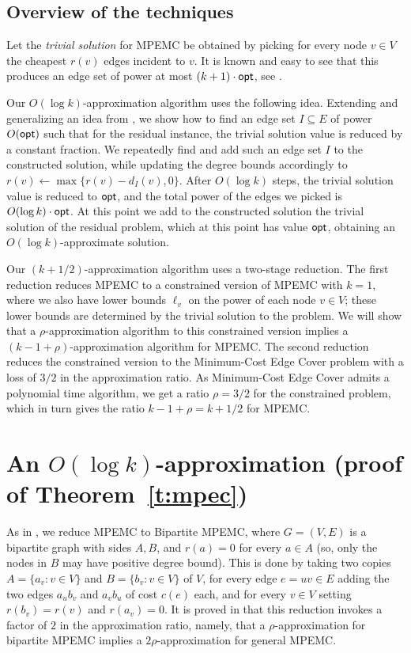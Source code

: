 \documentclass{llncs}
\begin{document}
\subsection{Overview of the techniques}

Let the {\em trivial solution} for {\sf MPEMC} be obtained by picking for every 
node $v \in V$ the cheapest $r(v)$ edges incident to $v$.
It is known and easy to see that this produces an edge set of power at most 
$(k+1) \cdot {\sf opt}$, see \cite{HKMN}. 

Our $O(\log k)$-approximation algorithm uses the following idea.
Extending and generalizing an idea from \cite{KMNT},
we show how to find an edge set $I \subseteq E$ of power $O({\sf opt})$
such that for the residual instance, 
the trivial solution value is reduced by a constant fraction.
We repeatedly find and add such an edge set $I$ to the constructed solution, 
while updating the degree bounds accordingly to $r(v) \gets \max\{r(v)-d_I(v),0\}$.
After $O(\log k)$ steps, the trivial solution value is reduced to ${\sf opt}$, 
and the total power of the edges we picked is $O(\log k) \cdot {\sf opt}$.
At this point we add to the constructed solution the trivial solution of the residual problem,
which at this point has value ${\sf opt}$, obtaining an $O(\log k)$-approximate solution.

Our $(k+1/2)$-approximation algorithm uses a two-stage reduction.
The first reduction reduces {\sf MPEMC} to a constrained version of {\sf MPEMC} 
with $k=1$, where we also have lower bounds $\ell_v$ on the power 
of each node $v \in V$; these lower bounds are determined by the trivial solution
to the problem. We will show that a $\rho$-approximation 
algorithm to this constrained version implies a $(k-1+\rho)$-approximation
algorithm for {\sf MPEMC}. The second reduction reduces the constrained version 
to the {\sf Minimum-Cost Edge Cover} problem with a loss of $3/2$ in the 
approximation ratio. As {\sf Minimum-Cost Edge Cover} admits a polynomial time algorithm, 
we get a ratio $\rho=3/2$ for the constrained problem,
which in turn gives the ratio $k-1+\rho=k+1/2$ for {\sf MPEMC}.

\section{An $O(\log k)$-approximation (proof of Theorem~\ref{t:mpec})}

As in \cite{KMNT}, we reduce {\sf MPEMC} to {\sf Bipartite MPEMC},
where $G=(V,E)$ is a bipartite graph with sides $A,B$, and $r(a)=0$ for every $a \in A$ 
(so, only the nodes in $B$ may have positive degree bound).
This is done by taking two copies $A=\{a_v:v \in V\}$ and $B=\{b_v:v \in V\}$ of $V$,
for every edge $e=uv \in E$ adding the two edges $a_ub_v$ and $a_vb_u$ of cost $c(e)$ each,
and for every $v \in V$ setting $r(b_v)=r(v)$ and $r(a_v)=0$.
It is proved in \cite{KMNT} that this reduction invokes a factor of $2$ in the
approximation ratio, namely, that a $\rho$-approximation for bipartite {\sf MPEMC} 
implies a $2\rho$-approximation for general {\sf MPEMC}.
\end{document}
